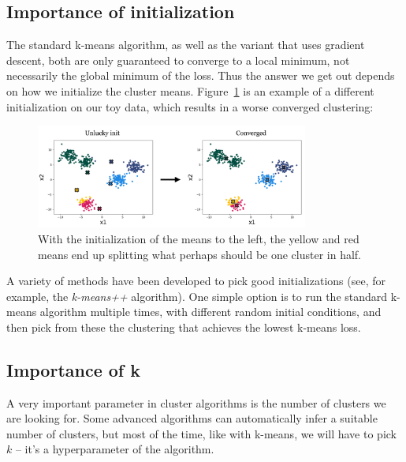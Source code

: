 

\subsection{Importance of initialization}
The standard k-means algorithm, as well as the variant that uses
gradient descent, both are only guaranteed to converge to a local
minimum, not necessarily the global minimum of the loss. Thus the
answer we get out depends on how we initialize the cluster
means. Figure~\ref{fig:kmeans_init} is an example of a different
initialization on our toy data, which results in a worse converged
clustering:

\begin{figure}[h]
  \centering
  \includegraphics[width=0.8\textwidth]{./figures/kmeans_init.png}
  \caption{With the initialization of the means to the left, the
    yellow and red means end up splitting what perhaps should be one
    cluster in half.}
  \label{fig:kmeans_init}
\end{figure}

A variety of methods have been developed to pick good initializations
(see, for example, the \textit{k-means++} algorithm). One simple
option is to run the standard k-means algorithm multiple times, with
different random initial conditions, and then pick from these the
clustering that achieves the lowest k-means loss.

\subsection{Importance of k}\label{sec-importance_of_k}

A very important parameter in cluster algorithms is the number of
clusters we are looking for. Some advanced algorithms can
automatically infer a suitable number of clusters, but most of the
time, like with k-means, we will have to pick $k$ -- it's a
hyperparameter of the algorithm.

